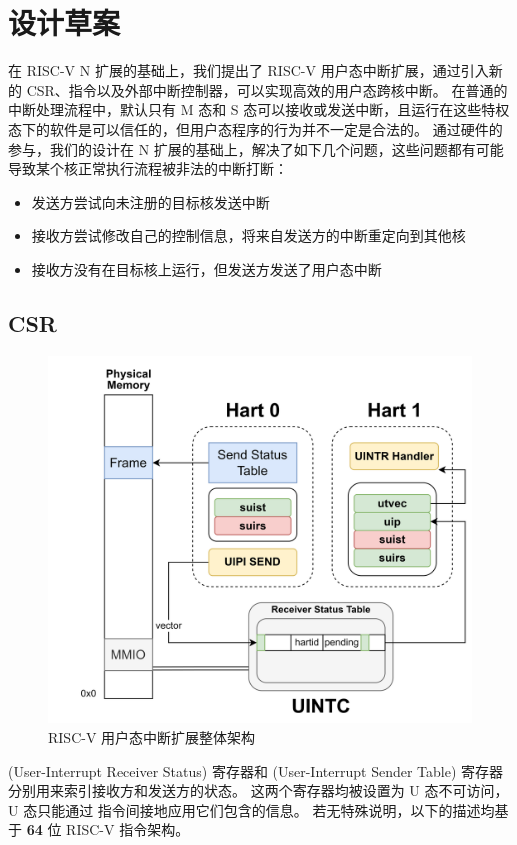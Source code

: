 
\chapter{设计草案}

在 RISC-V N 扩展的基础上，我们提出了 RISC-V 用户态中断扩展，通过引入新的 CSR、指令以及外部中断控制器，可以实现高效的用户态跨核中断。
在普通的中断处理流程中，默认只有 M 态和 S 态可以接收或发送中断，且运行在这些特权态下的软件是可以信任的，但用户态程序的行为并不一定是合法的。
通过硬件的参与，我们的设计在 N 扩展的基础上，解决了如下几个问题，这些问题都有可能导致某个核正常执行流程被非法的中断打断：

\begin{itemize}
    \item 发送方尝试向未注册的目标核发送中断
    \item 接收方尝试修改自己的控制信息，将来自发送方的中断重定向到其他核
    \item 接收方没有在目标核上运行，但发送方发送了用户态中断
\end{itemize}

\section{CSR}

\begin{figure}
    \centering
    \includegraphics[width=0.8\linewidth]{figures/uintr.png}
    \caption{RISC-V 用户态中断扩展整体架构}
    \label{fig:uintr}
\end{figure}

\textbf{\Rsuirs}(User-Interrupt Receiver Status) 寄存器和 \textbf{\Rsuist}(User-Interrupt Sender Table) 寄存器分别用来索引接收方和发送方的状态。
这两个寄存器均被设置为 U 态不可访问，U 态只能通过 \Iuipi 指令间接地应用它们包含的信息。
若无特殊说明，以下的描述均基于 \textbf{64} 位 RISC-V 指令架构。

